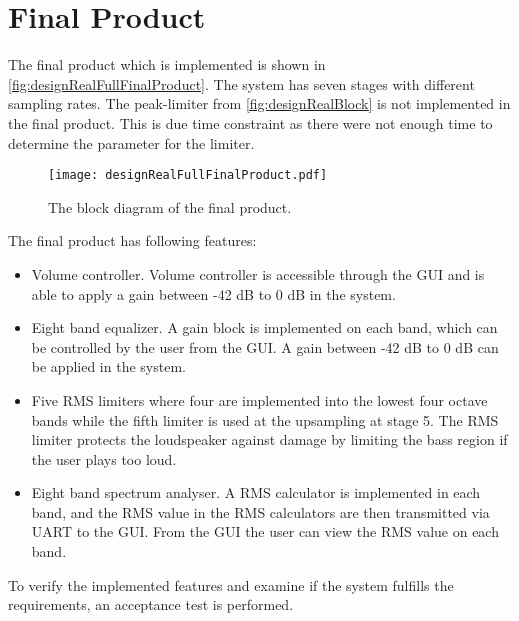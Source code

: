 \chapter{Final Product} \label{ch:finalProduct}

The final product which is implemented is shown in \autoref{fig:designRealFullFinalProduct}. The system has seven stages with different sampling rates. The peak-limiter from \autoref{fig:designRealBlock} is not implemented in the final product. This is due time constraint as there were not enough time to determine the parameter for the limiter.

\begin{figure}[H]
\centering
\texttt{[image: designRealFullFinalProduct.pdf]}
\caption{The block diagram of the final product.}
\label{fig:designRealFullFinalProduct}
\end{figure}

The final product has following features:

\begin{itemize}
\item Volume controller. Volume controller is accessible through the GUI and is able to apply a gain between -42 dB to 0 dB in the system.
\item Eight band equalizer. A gain block is implemented on each band, which can be controlled by the user from the GUI. A gain between -42 dB to 0 dB can be applied in the system.
\item Five RMS limiters where four are implemented into the lowest four octave bands while the fifth limiter is used at the upsampling at stage 5. The RMS limiter protects the loudspeaker against damage by limiting the bass region if the user plays too loud. 
\item Eight band spectrum analyser. A RMS calculator is implemented in each band, and the RMS value in the RMS calculators are then transmitted via UART to the GUI. From the GUI the user can view the RMS value on each band.
\end{itemize}

To verify the implemented features and examine if the system fulfills the requirements, an acceptance test is performed.



